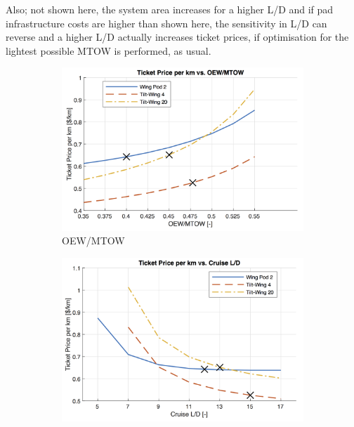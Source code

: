 Also; not shown here, the system area increases for a higher L/D and if pad infrastructure costs are higher than shown here, the sensitivity in L/D can reverse and a higher L/D actually increases ticket prices, if optimisation for the lightest possible MTOW is performed, as usual.

\begin{figure}[H]
\begin{subfigure}[t]{0.33\textwidth}
    \centering
    \includegraphics[width=\textwidth]{Figures/OEWMTOW_TPrice_perkmNOPAD.png}
    \captionsetup{justification=centering}
    \caption{OEW/MTOW}
    \label{fig:sens4}
\end{subfigure}
\begin{subfigure}[t]{0.33\textwidth}
    \centering
    \includegraphics[width=\textwidth]{Figures/LoD_TPrice_perkmNOPAD.png}
    \captionsetup{justification=centering}
    \caption{}

\end{subfigure}
\end{figure}

